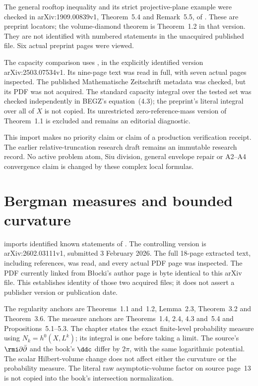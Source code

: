 The general rooftop inequality and its strict projective-plane
example were checked in arXiv:1909.00839v1, Theorem~5.4 and
Remark~5.5, of \cite{DDNLmetric}. These are preprint locators;
the volume-diamond theorem is Theorem~1.2 in that version.
They are not identified with numbered statements in the
unacquired published file. Six actual preprint pages were viewed.

The capacity comparison uses \cite[Theorem~1.2]{DDP25MassPreprint},
in the explicitly identified version arXiv:2503.07534v1. Its nine-page
text was read in full, with seven actual pages inspected.
The published Mathematische Zeitschrift metadata was checked,
but its PDF was not acquired. The standard capacity integral
over the tested set was checked independently in BEGZ's
equation~(4.3); the preprint's literal integral over all of $X$
is not copied. Its unrestricted zero-reference-mass version
of Theorem~1.1 is excluded and remains an editorial diagnostic.

This import makes no priority claim or claim of a production
verification receipt. The earlier relative-truncation research
draft remains an immutable research record. No active problem
atom, Siu division, general envelope repair or A2--A4 convergence
claim is changed by these complex local formulas.

\section{Bergman measures and bounded curvature}
\label{sec:provenance-bergman-radon}

 imports identified known
statements of \cite{BlockiDarvas26Radon}. The controlling version is
arXiv:2602.03111v1, submitted 3 February 2026.
The full 18-page extracted text, including
references, was read, and every actual PDF page was inspected. The
PDF currently linked from B\l ocki's author page is byte identical
to this arXiv file. This establishes identity of those two acquired
files; it does not assert a publisher version or publication date.

The regularity anchors are Theorems~1.1 and~1.2, Lemma~2.3,
Theorem~3.2 and Theorem~3.6. The measure anchors are Theorems~1.4,
2.4, 4.3 and~5.4 and Propositions~5.1--5.3. The chapter states
the exact finite-level probability measure using $N_k=h^0(X,L^k)$;
its integral is one before taking a limit. The source's
$\rmi\partial\bar\partial$ and the book's $\ddc$ differ by $2\pi$,
with the same logarithmic potential. The scalar Hilbert-volume change
does not affect either the curvature or the probability measure.
The literal raw asymptotic-volume factor on source page~13 is not
copied into the book's intersection normalization.

